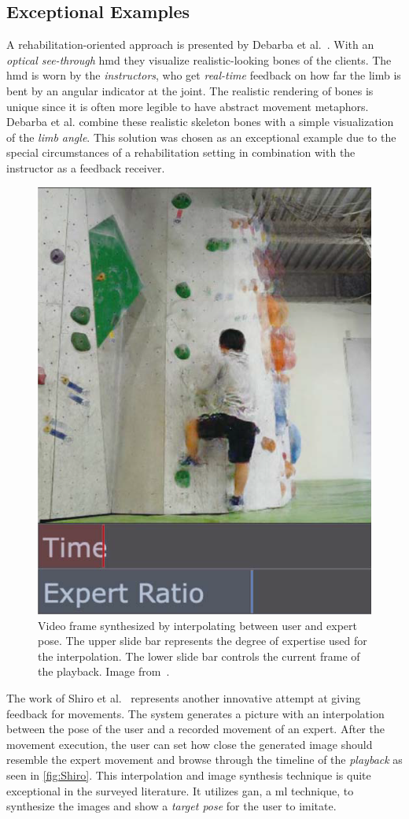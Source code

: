 \subsection{Exceptional Examples}
A rehabilitation-oriented approach is presented by Debarba et al.~\cite{debarba2018arv}. With an \emph{optical see-through} \acrshort{hmd} they visualize realistic-looking bones of the clients. The \acrshort{hmd} is worn by the \emph{instructors}, who get \emph{real-time} feedback on how far the limb is bent by an angular indicator at the joint. The realistic rendering of bones is unique since it is often more legible to have abstract movement metaphors. Debarba et al. combine these realistic skeleton bones with a simple visualization of the \emph{limb angle}. This solution was chosen as an exceptional example due to the special circumstances of a rehabilitation setting in combination with the instructor as a feedback receiver.
\begin{figure}[h!t]
    \centering
    \includegraphics[height=0.4\linewidth]{pictures/Shiro.png}
    \caption[Synthesized frame between expert and beginner.]{Video frame synthesized by interpolating between user and expert pose. The upper slide bar represents the degree of expertise used for the interpolation. The lower slide bar controls the current frame of the playback. Image from~\cite{shiro2019ipv}.\label{fig:Shiro}}
\end{figure}

The work of Shiro et al.~\cite{shiro2019ipv} represents another innovative attempt at giving feedback for movements. The system generates a picture with an interpolation between the pose of the user and a recorded movement of an expert. After the movement execution, the user can set how close the generated image should resemble the expert movement and browse through the timeline of the \emph{playback} as seen in \autoref{fig:Shiro}. This interpolation and image synthesis technique is quite exceptional in the surveyed literature. It utilizes \acrfull{gan}, a \acrfull{ml} technique, to synthesize the images and show a \emph{target pose} for the user to imitate.


